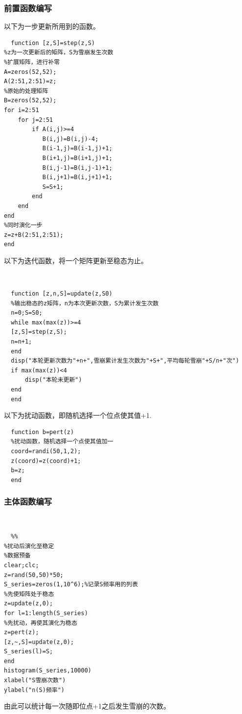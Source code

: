 \documentclass[UTF8,a4paper,10pt]{ctexart}
\begin{document}
\subsubsection{前置函数编写}
以下为一步更新所用到的函数。\newline
~\\
\lstset{language=matlab}
\begin{lstlisting}
  function [z,S]=step(z,S)
%z为一次更新后的矩阵，S为雪崩发生次数
%扩展矩阵，进行补零
A=zeros(52,52);
A(2:51,2:51)=z;
%原始的处理矩阵
B=zeros(52,52);
for i=2:51
    for j=2:51
        if A(i,j)>=4
           B(i,j)=B(i,j)-4;
           B(i-1,j)=B(i-1,j)+1;
           B(i+1,j)=B(i+1,j)+1;
           B(i,j-1)=B(i,j-1)+1;
           B(i,j+1)=B(i,j+1)+1;
           S=S+1;
        end
    end
end
%同时演化一步
z=z+B(2:51,2:51);
end
\end{lstlisting}
以下为迭代函数，将一个矩阵更新至稳态为止。\newline

~\\
\lstset{language=matlab}
\begin{lstlisting}
  function [z,n,S]=update(z,S0)
  %输出稳态的z矩阵，n为本次更新次数，S为累计发生次数
  n=0;S=S0;
  while max(max(z))>=4
  [z,S]=step(z,S);
  n=n+1;
  end
  disp("本轮更新次数为"+n+",雪崩累计发生次数为"+S+",平均每轮雪崩"+S/n+"次")
  if max(max(z))<4
      disp("本轮未更新")
  end
  end  
\end{lstlisting}
以下为扰动函数，即随机选择一个位点使其值+1.\newline
~\\
\lstset{language=matlab}
\begin{lstlisting}
  function b=pert(z)
  %扰动函数，随机选择一个点使其值加一
  coord=randi(50,1,2);
  z(coord)=z(coord)+1;
  b=z;
  end 
\end{lstlisting}
\subsubsection{主体函数编写}
~\\
\lstset{language=matlab}
\begin{lstlisting}
  %%
%扰动后演化至稳定
%数据预备
clear;clc;
z=rand(50,50)*50;
S_series=zeros(1,10^6);%记录S频率用的列表
%先使矩阵处于稳态
z=update(z,0);
for l=1:length(S_series)
%先扰动，再使其演化为稳态
z=pert(z);
[z,~,S]=update(z,0);
S_series(l)=S;
end
histogram(S_series,10000)
xlabel("S雪崩次数")
ylabel("n(S)频率")
\end{lstlisting}
由此可以统计每一次随即位点+1之后发生雪崩的次数。
\end{document}
